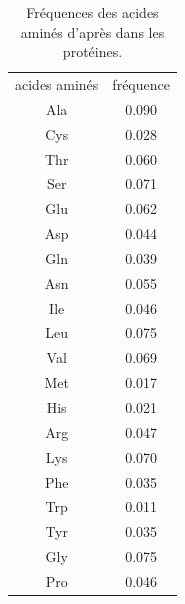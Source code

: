     \begin{table}[!htbp]
      \centering

      \begin{tabular}{cc}

        \toprule
        acides aminés & fréquence \\
        \cmidrule{1-2}

        Ala &   0.090 \\      
        Cys &   0.028 \\  
        Thr &   0.060 \\  
        Ser &   0.071 \\  
        Glu &   0.062 \\  
        Asp &   0.044 \\  
        Gln &   0.039 \\  
        Asn &   0.055 \\  
        Ile &   0.046 \\  
        Leu &   0.075 \\  
        Val &   0.069 \\  
        Met &   0.017 \\  
        His &   0.021 \\  
        Arg &   0.047 \\  
        Lys &   0.070 \\  
        Phe &   0.035 \\  
        Trp &   0.011 \\  
        Tyr &   0.035 \\  
        Gly &   0.075 \\  
        Pro &   0.046 \\      
        \bottomrule


      \end{tabular}      
      \caption{Fréquences des acides aminés d'après dans les  protéines.}
\label{tab:AA_groupes}      
    \end{table}


